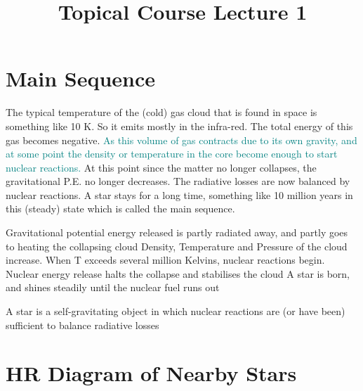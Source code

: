 \documentclass{../template/texnote}
\title{Topical Course Lecture 1}
\begin{document}
    \maketitle {}
\section{Main Sequence}
The typical temperature of the (cold) gas cloud that is found in space is something like 10 K.
So it emits mostly in the infra-red.
The total energy of this gas becomes negative.%
\textcolor{teal}{As this volume of gas contracts due to its own gravity, and at some point the density or temperature in the core become enough to 
start nuclear reactions.}
At this point since the matter no longer collapses, the gravitational P.E. no longer decreases. %
The radiative losses are now balanced by nuclear reactions.
A star stays for a long time, something like 10 million years in this (steady) state which is called the main sequence.

Gravitational potential energy released is partly radiated away,
and partly goes to heating the collapsing cloud
Density, Temperature and Pressure of the cloud increase.
When T exceeds several million Kelvins, nuclear reactions begin.
Nuclear energy release halts the collapse and stabilises the
cloud
A star is born, and shines steadily until the nuclear fuel runs
out

A star is a self-gravitating object in which nuclear reactions are
(or have been) sufficient to balance radiative losses
\section{HR Diagram of Nearby Stars}
\end{document}
